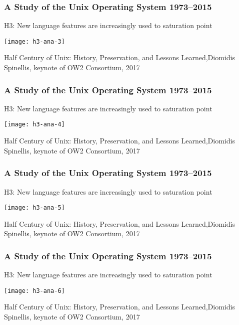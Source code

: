 \begin{frame}[plain]
	\frametitle{A Study of the Unix Operating System 1973–2015}
	\centering
	H3: New language features are
	increasingly used to saturation point
	
	
	\texttt{[image: h3-ana-3]}
	
	\tiny Half Century of Unix:
	History, Preservation, and
	Lessons Learned,Diomidis Spinellis, keynote of OW2 Consortium, 2017
	
\end{frame}	

\begin{frame}[plain]
	\frametitle{A Study of the Unix Operating System 1973–2015}
	\centering
	H3: New language features are
	increasingly used to saturation point
	
	
	\texttt{[image: h3-ana-4]}
	
	\tiny Half Century of Unix:
	History, Preservation, and
	Lessons Learned,Diomidis Spinellis, keynote of OW2 Consortium, 2017
	
\end{frame}	

\begin{frame}[plain]
	\frametitle{A Study of the Unix Operating System 1973–2015}
	\centering
	H3: New language features are
	increasingly used to saturation point
	
	
	\texttt{[image: h3-ana-5]}
	
	\tiny Half Century of Unix:
	History, Preservation, and
	Lessons Learned,Diomidis Spinellis, keynote of OW2 Consortium, 2017
	
\end{frame}	

\begin{frame}[plain]
	\frametitle{A Study of the Unix Operating System 1973–2015}
	\centering
	H3: New language features are
	increasingly used to saturation point
	
	
	\texttt{[image: h3-ana-6]}
	
	\tiny Half Century of Unix:
	History, Preservation, and
	Lessons Learned,Diomidis Spinellis, keynote of OW2 Consortium, 2017
	
\end{frame}	


